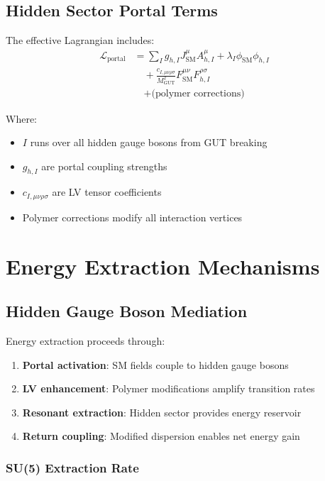 \documentclass[11pt]{article}
\begin{document}
\subsection{Hidden Sector Portal Terms}

The effective Lagrangian includes:
\begin{align}
\mathcal{L}_{\text{portal}} &= \sum_{I} g_{h,I} J_{\text{SM}}^\mu A_{h,I}^\mu + \lambda_I \phi_{\text{SM}} \phi_{h,I} \\
&\quad + \frac{c_{I,\mu\nu\rho\sigma}}{M_{\text{GUT}}^2} F_{\text{SM}}^{\mu\nu} F_{h,I}^{\rho\sigma} \\
&\quad + \text{(polymer corrections)}
\end{align}

Where:
\begin{itemize}
    \item $I$ runs over all hidden gauge bosons from GUT breaking
    \item $g_{h,I}$ are portal coupling strengths
    \item $c_{I,\mu\nu\rho\sigma}$ are LV tensor coefficients
    \item Polymer corrections modify all interaction vertices
\end{itemize}

\section{Energy Extraction Mechanisms}

\subsection{Hidden Gauge Boson Mediation}

Energy extraction proceeds through:
\begin{enumerate}
    \item \textbf{Portal activation}: SM fields couple to hidden gauge bosons
    \item \textbf{LV enhancement}: Polymer modifications amplify transition rates
    \item \textbf{Resonant extraction}: Hidden sector provides energy reservoir
    \item \textbf{Return coupling}: Modified dispersion enables net energy gain
\end{enumerate}

\subsubsection{SU(5) Extraction Rate}
\end{document}
